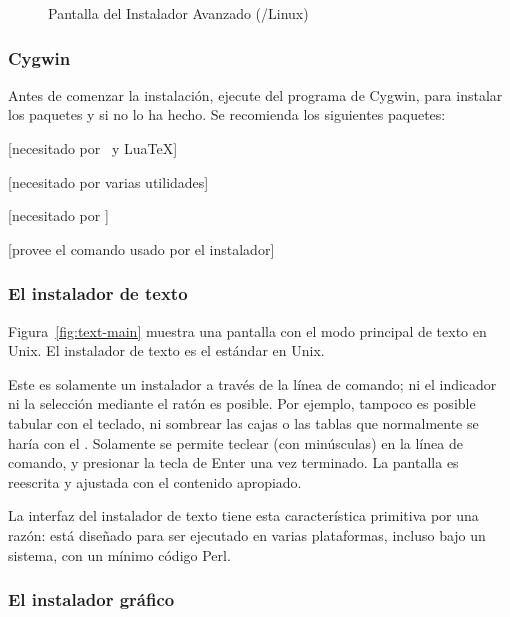 \documentclass{article}
\begin{document}
\begin{figure}[tb]
\caption{Pantalla del Instalador Avanzado \GUI{}
	(\GNU/Linux)}\label{fig:advanced-lnx}
\end{figure}

\subsubsection{Cygwin}
\label{sec:cygwin}

Antes de comenzar la instalación, ejecute  del
programa de Cygwin, para instalar los paquetes  y
 si no lo ha hecho. Se recomienda los siguientes
paquetes:
\begin{itemize*}
	\item {}[necesitado por \XeTeX\ y Lua\TeX]
	\item {} [necesitado por varias utilidades]
	\item {} [necesitado por ]
	\item {} [provee el comando  usado por el instalador]
\end{itemize*}

\subsubsection{El instalador de texto}

Figura~\ref{fig:text-main} muestra una pantalla con el modo principal
de texto en Unix. El instalador de texto es el estándar en Unix. 

Este es solamente un instalador a través de la línea de comando; ni el
indicador ni la selección mediante el ratón es posible. Por ejemplo,
tampoco es posible tabular con el teclado, ni sombrear las cajas o las
tablas que normalmente se haría con el \GUI. Solamente se permite
teclear (con minúsculas) en la línea de comando, y presionar la tecla
de Enter una vez terminado. La pantalla es reescrita y ajustada con el
contenido apropiado. 

La interfaz del instalador de texto tiene esta
característica primitiva por una razón: está diseñado para
ser ejecutado en varias plataformas, incluso bajo un
sistema, con un mínimo código Perl. 

\subsubsection{El instalador gráfico}
\label{sec:graphical-inst}
\end{document}
